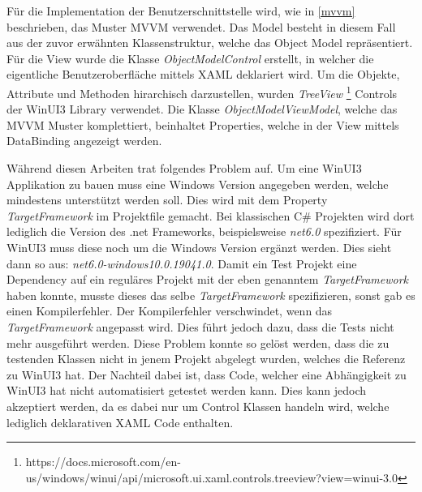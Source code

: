 
Für die Implementation der Benutzerschnittstelle wird, wie in \ref{mvvm} beschrieben, das Muster \ac{MVVM} verwendet.
Das Model besteht in diesem Fall aus der zuvor erwähnten Klassenstruktur, welche das Object Model repräsentiert.
Für die View wurde die Klasse \textit{ObjectModelControl} erstellt, in welcher die eigentliche Benutzeroberfläche mittels XAML deklariert wird.
Um die Objekte, Attribute und Methoden hirarchisch darzustellen, wurden  \textit{TreeView} \footnote{https://docs.microsoft.com/en-us/windows/winui/api/microsoft.ui.xaml.controls.treeview?view=winui-3.0} Controls der WinUI3 Library verwendet.
Die Klasse \textit{ObjectModelViewModel}, welche das \ac{MVVM} Muster komplettiert, beinhaltet Properties, welche in der View mittels DataBinding angezeigt werden.

Während diesen Arbeiten trat folgendes Problem auf.
Um eine WinUI3 Applikation zu bauen muss eine Windows Version angegeben werden, welche mindestens unterstützt werden soll.
Dies wird mit dem Property \textit{TargetFramework} im Projektfile gemacht.
Bei klassischen C\# Projekten wird dort lediglich die Version des .net Frameworks, beispielsweise \textit{net6.0} spezifiziert.
Für WinUI3 muss diese noch um die Windows Version ergänzt werden. Dies sieht dann so aus: \textit{net6.0-windows10.0.19041.0}.
Damit ein Test Projekt eine Dependency auf ein reguläres Projekt mit der eben genanntem \textit{TargetFramework} haben konnte, musste dieses das selbe \textit{TargetFramework} spezifizieren, sonst gab es einen Kompilerfehler.
Der Kompilerfehler verschwindet, wenn das \textit{TargetFramework} angepasst wird. Dies führt jedoch dazu, dass die Tests nicht mehr ausgeführt werden.
Diese Problem konnte so gelöst werden, dass die zu testenden Klassen nicht in jenem Projekt abgelegt wurden, welches die Referenz zu WinUI3 hat.
Der Nachteil dabei ist, dass Code, welcher eine Abhängigkeit zu WinUI3 hat nicht automatisiert getestet werden kann.
Dies kann jedoch akzeptiert werden, da es dabei nur um Control Klassen handeln wird, welche lediglich deklarativen XAML Code enthalten.


\pagebreak

